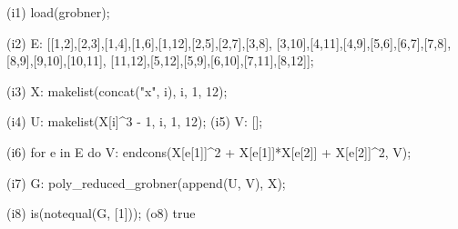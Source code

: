 \begin{python}
(i1) load(grobner);

(i2) E: [[1,2],[2,3],[1,4],[1,6],[1,12],[2,5],[2,7],[3,8],
[3,10],[4,11],[4,9],[5,6],[6,7],[7,8],[8,9],[9,10],[10,11],
[11,12],[5,12],[5,9],[6,10],[7,11],[8,12]];

(i3) X: makelist(concat("x", i), i, 1, 12);

(i4) U: makelist(X[i]^3 - 1, i, 1, 12);
(i5) V: [];

(i6) for e in E do
        V: endcons(X[e[1]]^2 + X[e[1]]*X[e[2]] + X[e[2]]^2, V);

(i7) G: poly_reduced_grobner(append(U, V), X);

(i8) is(notequal(G, [1]));
(o8) true
\end{python}

